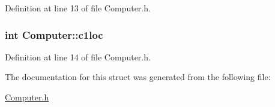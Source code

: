 Definition at line 13 of file Computer.\+h.

\hypertarget{struct_computer_a1799e7ad4060c0f18e4402f92e6194e0}{}
\subsubsection[{c1loc}]{\setlength{\rightskip}{0pt plus 5cm}int Computer\+::c1loc}\label{struct_computer_a1799e7ad4060c0f18e4402f92e6194e0}


Definition at line 14 of file Computer.\+h.



The documentation for this struct was generated from the following file\+:\begin{DoxyCompactItemize}
\item 
\hyperlink{_computer_8h}{Computer.\+h}\end{DoxyCompactItemize}
